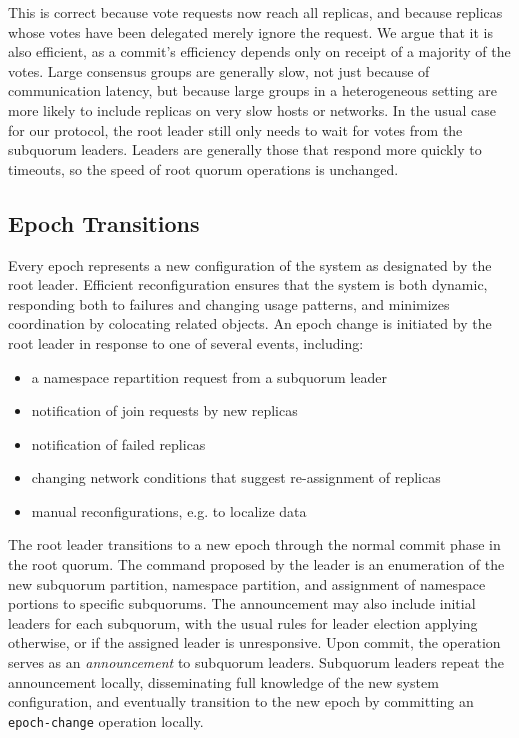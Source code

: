 \documentclass[sigplan,screen,review,anonymous,nonacm]{acmart}
\begin{document}
This is correct because vote requests now reach all replicas, and 
because replicas whose votes have been delegated merely ignore the 
request.
We argue that it is also efficient, as a commit's efficiency depends 
only on receipt of a majority of the votes.
Large consensus groups are generally slow, not just because of 
communication latency, but because large groups in a heterogeneous 
setting are more likely to include replicas on very slow hosts or 
networks.
In the usual case for our protocol, the root leader still only needs 
to wait for votes from the subquorum leaders.
Leaders are generally those that respond more quickly to timeouts, so 
the speed of root quorum operations is unchanged.


\subsection{Epoch Transitions}

Every epoch represents a new configuration of the system as designated 
by the root leader.
Efficient reconfiguration ensures that the system is both dynamic, 
responding both to failures and changing usage patterns, and minimizes 
coordination by colocating related objects.
An epoch change is initiated by the root leader in response to one of 
several events, including:

\renewcommand{\baselinestretch}{1}
\begin{itemize}
    \item a namespace repartition request from a subquorum leader
    \item notification of join requests by new replicas
    \item notification of failed replicas
    \item changing network conditions that suggest re-assignment of replicas
    \item manual reconfigurations, e.g. to localize data
\end{itemize}
\renewcommand{\baselinestretch}{2}

The root leader transitions to a new epoch through the normal commit 
phase in the root quorum.
The command proposed by the leader is an enumeration of the new subquorum 
partition, namespace partition, and assignment of namespace portions to 
specific subquorums.
The announcement may also include initial leaders for each subquorum, 
with the usual rules for leader election applying otherwise, or if the 
assigned leader is unresponsive.
Upon commit, the operation serves as an \emph{announcement} to subquorum 
leaders.
Subquorum leaders repeat the announcement locally, disseminating full 
knowledge of the new system configuration, and eventually transition to 
the new epoch by committing an \texttt{epoch-change} operation locally.
\end{document}
